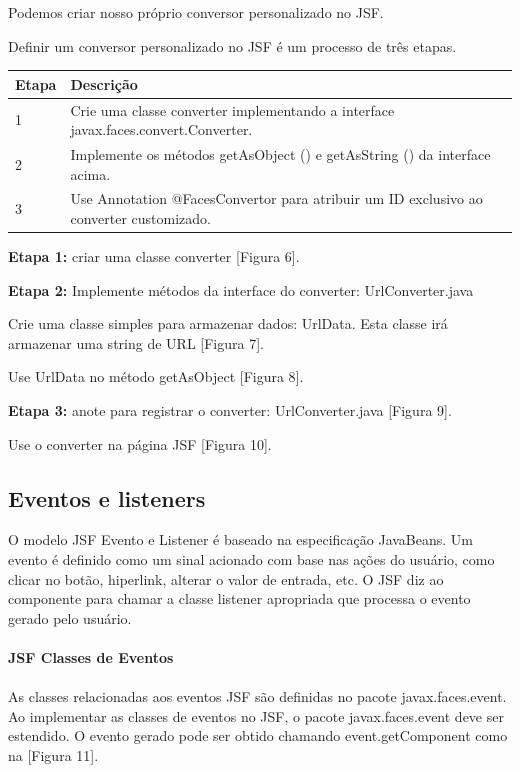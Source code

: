 \documentclass[	DIV=calc,%
							paper=a4,%
							fontsize=12pt,%
							onecolumn]{scrartcl}	 					%
\begin{document}
Podemos criar nosso próprio conversor personalizado no JSF.

Definir um conversor personalizado no JSF é um processo de três etapas.
\begin{center}
	\begin{tabular}{| p{2cm} | p{14cm} |}
		\hline
		\textbf{Etapa} & \textbf{Descrição} \\ \hline
		1 & Crie uma classe converter implementando a interface javax.faces.convert.Converter.\\ \hline
		2 & Implemente os métodos getAsObject () e getAsString () da interface acima.\\ \hline
		3 & Use Annotation @FacesConvertor para atribuir um ID exclusivo ao converter customizado.\\ \hline
	\end{tabular}
\end{center}


\textbf{Etapa 1:} criar uma classe converter [Figura 6].

\textbf{Etapa 2:} Implemente métodos da interface do converter: UrlConverter.java

Crie uma classe simples para armazenar dados: UrlData.
Esta classe irá armazenar uma string de URL [Figura 7].

Use UrlData no método getAsObject [Figura 8].

\textbf{Etapa 3:} anote para registrar o converter: UrlConverter.java [Figura 9].

Use o converter na página JSF [Figura 10].


\subsection{Eventos e listeners}


O modelo JSF Evento e Listener é baseado na especificação JavaBeans. Um evento é definido como um sinal acionado com base nas ações do usuário, como clicar no botão, hiperlink, alterar o valor de entrada, etc. O JSF diz ao componente para chamar a classe listener apropriada que processa o evento gerado pelo usuário.\\~\\

\textbf{JSF Classes de Eventos}\\~\\

As classes relacionadas aos eventos JSF são definidas no pacote javax.faces.event. Ao implementar as classes de eventos no JSF, o pacote javax.faces.event deve ser estendido. O evento gerado pode ser obtido chamando event.getComponent como na [Figura 11].
\end{document}
